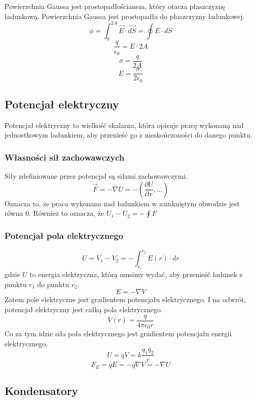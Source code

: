 \documentclass{../notatki}
\begin{document}
Powierzchnia Gaussa jest prostopadłościanem, który otacza płaszczyznę
ładunkową. Powierzchnia Gaussa jest prostopadła do płaszczyzny ładunkowej.
$$
\phi = \int_{0}^{2A} \vec{E} \cdot \vec{dS} = \oint E \cdot dS
$$
$$
\frac{q}{\epsilon_0} = E \cdot 2A
$$
$$
\sigma = \frac{q}{2A}
$$
$$
E = \frac{\sigma}{2\epsilon_0}
$$

\subsection{Potencjał elektryczny}

Potencjał elektryczny to wielkość skalarna, która opisuje pracę wykonaną nad
jednostkowym ładunkiem, aby przenieść go z nieskończoności do danego punktu.

\subsubsection{Własności sił zachowawczych}

Siły zdefiniowane przez potencjał są siłami zachowawczymi.
$$
\vec{F} = - \nabla U = - (\frac{\partial U}{\partial x}, \dots)
$$
Oznacza to, że praca wykonana nad ładunkiem w zamkniętym obwodzie jest równa 0.
Również to oznacza, że $U_1 - U_2 = - \oint F$

\subsubsection{Potencjał pola elektrycznego}

$$
U = V_1 - V_2 = - \int_{r_1}^{r_2} E(r) \cdot dr
$$
gdzie $U$ to energia elektryczna, którą musimy wydać, aby przenieść ładunek z
punktu $r_1$ do punktu $r_2$.
$$
E = - \nabla V
$$
Zatem pole elektryczne jest gradientem potencjału elektrycznego. I na odwrót,
potencjał elektryczny jest całką pola elektrycznego.
$$
V(r) = \frac{q}{4\pi\epsilon_0 r}
$$
Co za tym idzie siła pola elektrycznego jest gradientem potencjału
energii elektrycznego.
$$
U = qV = k \frac{q_1 q_2}{r}
$$
$$
F_E = qE = -q \nabla V = - \nabla U
$$

\subsection{Kondensatory}
\end{document}

